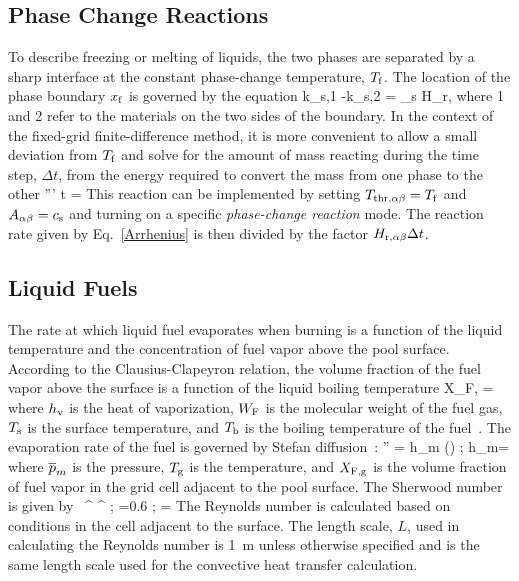 \subsection{Phase Change Reactions}

To describe freezing or melting of liquids, the two phases are separated by a sharp interface at the constant phase-change temperature, $T_{\rm f}$. The location of the phase boundary $x_{\rm f}$ is governed by the equation
\be
k_{\rm s,1} -k_{\rm s,2} = \rho_{\rm s} H_{\rm r,\alpha\beta} 
\ee
where 1 and 2 refer to the materials on the two sides of the boundary. In the context of the fixed-grid finite-difference method, it is more convenient
to allow a small deviation from $T_{\rm f}$ and solve for the amount of mass reacting during the time step, $\Delta t$,
from the energy required to convert the mass from one phase to the other
\be
{}''' \Delta t = 
\ee
This reaction can be implemented by setting $T_{\rm thr,\alpha\beta} = T_{\rm f}$ and $A_{\alpha\beta} = c_{\rm s}$ and turning on a specific
{\em phase-change reaction} mode. The reaction rate given by Eq.~\ref{Arrhenius} is then divided by the factor $H_{\rm r,\alpha\beta} \Delta t$.

\subsection{Liquid Fuels}

The rate at which liquid fuel evaporates when burning is a function of the liquid temperature and the concentration of fuel vapor above the pool surface. According to the Clausius-Clapeyron relation, the volume fraction of the fuel vapor above the surface is a function of the liquid boiling temperature
\be X_{\rm F,\ell} = \exp {}
\label{CC_liquid}
\ee
where $h_{\rm v}$ is the heat of vaporization, $W_{\rm F}$ is the molecular weight of the fuel gas, $T_{\rm s}$ is the surface temperature, and $T_{\rm b}$ is the boiling temperature of the fuel~\cite{Prasad:1}. The evaporation rate of the fuel is governed by Stefan diffusion~\cite{Taylor&Krishna}:
\be
{}'' = h_{\rm m} \;  \; \ln \left(\right) \quad ; \quad h_{\rm m}= 
\ee
where $\overline{p}_m$ is the pressure, $T_{\rm g}$ is the temperature, and $X_{\rm F,g}$ is the volume fraction of fuel vapor in the grid cell adjacent to the pool surface. The Sherwood number is given by
\be
{}~\SC^{} \RE^{} \quad ; =0.6 \quad ; \quad \RE= 
\ee
The Reynolds number is calculated based on conditions in the cell adjacent to the surface. The length scale, $L$, used in calculating the Reynolds number is \SI{1}{m} unless otherwise specified and is the same length scale used for the convective heat transfer calculation.


